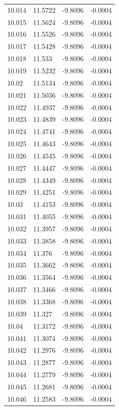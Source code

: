 \begin{tabular}{llll}
10.014 & 11.5722 & -9.8096 & -0.0004 \\
10.015 & 11.5624 & -9.8096 & -0.0004 \\
10.016 & 11.5526 & -9.8096 & -0.0004 \\
10.017 & 11.5428 & -9.8096 & -0.0004 \\
10.018 & 11.533 & -9.8096 & -0.0004 \\
10.019 & 11.5232 & -9.8096 & -0.0004 \\
10.02 & 11.5134 & -9.8096 & -0.0004 \\
10.021 & 11.5036 & -9.8096 & -0.0004 \\
10.022 & 11.4937 & -9.8096 & -0.0004 \\
10.023 & 11.4839 & -9.8096 & -0.0004 \\
10.024 & 11.4741 & -9.8096 & -0.0004 \\
10.025 & 11.4643 & -9.8096 & -0.0004 \\
10.026 & 11.4545 & -9.8096 & -0.0004 \\
10.027 & 11.4447 & -9.8096 & -0.0004 \\
10.028 & 11.4349 & -9.8096 & -0.0004 \\
10.029 & 11.4251 & -9.8096 & -0.0004 \\
10.03 & 11.4153 & -9.8096 & -0.0004 \\
10.031 & 11.4055 & -9.8096 & -0.0004 \\
10.032 & 11.3957 & -9.8096 & -0.0004 \\
10.033 & 11.3858 & -9.8096 & -0.0004 \\
10.034 & 11.376 & -9.8096 & -0.0004 \\
10.035 & 11.3662 & -9.8096 & -0.0004 \\
10.036 & 11.3564 & -9.8096 & -0.0004 \\
10.037 & 11.3466 & -9.8096 & -0.0004 \\
10.038 & 11.3368 & -9.8096 & -0.0004 \\
10.039 & 11.327 & -9.8096 & -0.0004 \\
10.04 & 11.3172 & -9.8096 & -0.0004 \\
10.041 & 11.3074 & -9.8096 & -0.0004 \\
10.042 & 11.2976 & -9.8096 & -0.0004 \\
10.043 & 11.2877 & -9.8096 & -0.0004 \\
10.044 & 11.2779 & -9.8096 & -0.0004 \\
10.045 & 11.2681 & -9.8096 & -0.0004 \\
10.046 & 11.2583 & -9.8096 & -0.0004 \\

\end{tabular}
